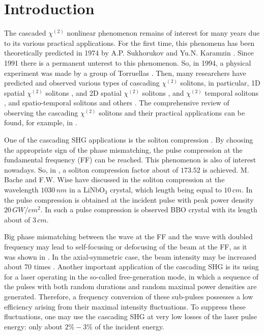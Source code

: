 \documentclass[a4paper, 12pt, onecolumn]{extarticle}
\begin{document}
\section{Introduction}
The cascaded \(\chi^{(2)}\) nonlinear phenomenon remains of interest for many years due to its various practical applications. For the first time, this phenomena has been theoretically predicted in 1974 by A.P. Sukhorukov and Yu.N. Karamzin \cite{bib:n1}. Since 1991 there is a permanent unterest to this phenomenon. So, in 1994, a physical experiment was made by a group of Torruellas \cite{bib:n2}. Then, many researchers have predicted and observed various types of cascading \(\chi^{(2)}\) solitons, in particular, 1D spatial \(\chi^{(2)}\) solitons \cite{bib:n3}, and 2D spatial \(\chi^{(2)}\) solitons \cite{bib:n2, bib:n4, bib:n5}, and \(\chi^{(2)}\) temporal solitons \cite{bib:n6}, and spatio-temporal solitons\cite{bib:n7} and others \cite{bib:n9,bib:n10}. The comprehensive review of observing the cascading \(\chi^{(2)}\) solitons and their practical applications can be found, for example, in \cite{bib:n8}.

One of the cascading SHG applications is the soliton compression \cite{bib:n11, bib:n12, bib:n13, bib:n14, bib:n15, bib:n16, bib:n17, bib:n18}. By choosing the appropriate sign of the phase mismatching, the pulse compression at the fundamental frequency (FF) can be reached. This phenomenon is also of interest nowadays. So, in \cite{bib:n11}, a soliton compression factor about of \(173.52\) is achieved. M. Bache and F.W. Wise have discussed in \cite{bib:n12} the soliton compression at the wavelength \(1030\,nm\) in a LiNbO$_3$ crystal, which length being equal to \(10\,cm\). In \cite{bib:n13} the pulse compression is obtained at the incident pulse with peak power density \(20\,GW/cm^2\). In \cite{bib:n14} such a pulse compression is observed BBO crystal with its length about of \(3\,cm\). 

Big phase mismatching between the wave at the FF and the wave with doubled frequency may lead to self-focusing or defocusing of the beam at the FF, as it was shown in \cite{bib:n19}. In the axial-symmetric case, the beam intensity may be increased about 70 times \cite{bib:n20}. Another important application of the cascading SHG is its using for a laser operating in the so-called free-generation mode, in which a sequence of the pulses with both random durations and random maximal power densities are generated. Therefore, a frequency conversion of these sub-pulses possesses a low efficiency arising from their maximal intensity fluctuations. To suppress these fluctuations, one may use the cascading SHG \cite{bib:n21,bib:n22,bib:n23a,bib:n23} at very low losses of the laser pulse energy: only about \(2\%-3\%\) of the incident energy.
\end{document}
